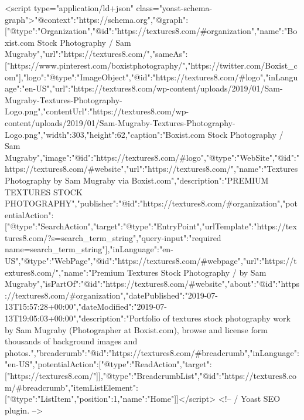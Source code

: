 	<script type="application/ld+json" class="yoast-schema-graph">{"@context":"https://schema.org","@graph":[{"@type":"Organization","@id":"https://textures8.com/#organization","name":"Boxist.com Stock Photography / Sam Mugraby","url":"https://textures8.com/","sameAs":["https://www.pinterest.com/boxistphotography/","https://twitter.com/Boxist_com"],"logo":{"@type":"ImageObject","@id":"https://textures8.com/#logo","inLanguage":"en-US","url":"https://textures8.com/wp-content/uploads/2019/01/Sam-Mugraby-Textures-Photography-Logo.png","contentUrl":"https://textures8.com/wp-content/uploads/2019/01/Sam-Mugraby-Textures-Photography-Logo.png","width":303,"height":62,"caption":"Boxist.com Stock Photography / Sam Mugraby"},"image":{"@id":"https://textures8.com/#logo"}},{"@type":"WebSite","@id":"https://textures8.com/#website","url":"https://textures8.com/","name":"Textures Photography by Sam Mugraby via Boxist.com","description":"PREMIUM TEXTURES STOCK PHOTOGRAPHY","publisher":{"@id":"https://textures8.com/#organization"},"potentialAction":[{"@type":"SearchAction","target":{"@type":"EntryPoint","urlTemplate":"https://textures8.com/?s={search_term_string}"},"query-input":"required name=search_term_string"}],"inLanguage":"en-US"},{"@type":"WebPage","@id":"https://textures8.com/#webpage","url":"https://textures8.com/","name":"Premium Textures Stock Photography / by Sam Mugraby","isPartOf":{"@id":"https://textures8.com/#website"},"about":{"@id":"https://textures8.com/#organization"},"datePublished":"2019-07-13T15:57:28+00:00","dateModified":"2019-07-13T19:05:03+00:00","description":"Portfolio of textures stock photography work by Sam Mugraby (Photographer at Boxist.com), browse and license form thousands of background images and photos.","breadcrumb":{"@id":"https://textures8.com/#breadcrumb"},"inLanguage":"en-US","potentialAction":[{"@type":"ReadAction","target":["https://textures8.com/"]}]},{"@type":"BreadcrumbList","@id":"https://textures8.com/#breadcrumb","itemListElement":[{"@type":"ListItem","position":1,"name":"Home"}]}]}</script>
	<!-- / Yoast SEO plugin. -->


